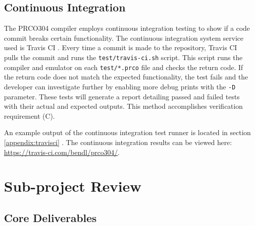 \documentclass[11pt,a4paper]{report}
\newcommand{\scname}{PRCO304}
\begin{document}
\subsection*{Continuous Integration}
The \scname{} compiler employs continuous integration testing to show if a code commit breaks certain functionality. The continuous integration system service used is Travis CI \citep{travisci}. Every time a commit is made to the repository, Travis CI pulls the commit and runs the \verb|test/travis-ci.sh| script. This script runs the compiler and emulator on each \verb|test/*.prco| file and checks the return code. If the return code does not match the expected functionality, the test fails and the developer can investigate further by enabling more debug prints with the \verb|-D| parameter. These tests will generate a report detailing passed and failed tests with their actual and expected outputs. This method accomplishes verification requirement (C).

An example output of the continuous integration test runner is located in section \ref{appendix:travisci} {}. The continuous integration results can be viewed here: \url{https://travis-ci.com/bendl/prco304/}.

\newpage
\section{Sub-project Review}
\subsection{Core Deliverables}
\end{document}
